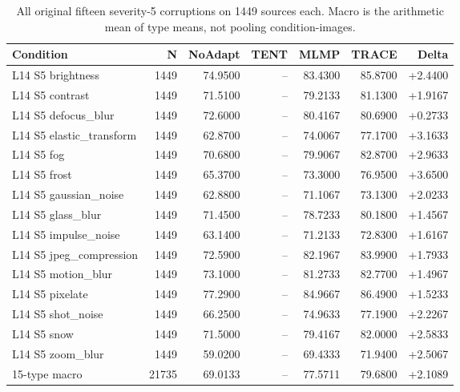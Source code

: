 \begin{table}[htbp]
\centering\scriptsize
\caption{All original fifteen severity-5 corruptions on 1449 sources each. Macro is the arithmetic mean of type means, not pooling condition-images.}
\label{tab:corruptions}
\setlength{\tabcolsep}{4pt}
\begin{tabular}{lrrrrrr}
\toprule
Condition & N & NoAdapt & TENT & MLMP & TRACE & Delta \\
\midrule
L14 S5 brightness & 1449 & 74.9500 & -- & 83.4300 & 85.8700 & +2.4400 \\
L14 S5 contrast & 1449 & 71.5100 & -- & 79.2133 & 81.1300 & +1.9167 \\
L14 S5 defocus\_blur & 1449 & 72.6000 & -- & 80.4167 & 80.6900 & +0.2733 \\
L14 S5 elastic\_transform & 1449 & 62.8700 & -- & 74.0067 & 77.1700 & +3.1633 \\
L14 S5 fog & 1449 & 70.6800 & -- & 79.9067 & 82.8700 & +2.9633 \\
L14 S5 frost & 1449 & 65.3700 & -- & 73.3000 & 76.9500 & +3.6500 \\
L14 S5 gaussian\_noise & 1449 & 62.8800 & -- & 71.1067 & 73.1300 & +2.0233 \\
L14 S5 glass\_blur & 1449 & 71.4500 & -- & 78.7233 & 80.1800 & +1.4567 \\
L14 S5 impulse\_noise & 1449 & 63.1400 & -- & 71.2133 & 72.8300 & +1.6167 \\
L14 S5 jpeg\_compression & 1449 & 72.5900 & -- & 82.1967 & 83.9900 & +1.7933 \\
L14 S5 motion\_blur & 1449 & 73.1000 & -- & 81.2733 & 82.7700 & +1.4967 \\
L14 S5 pixelate & 1449 & 77.2900 & -- & 84.9667 & 86.4900 & +1.5233 \\
L14 S5 shot\_noise & 1449 & 66.2500 & -- & 74.9633 & 77.1900 & +2.2267 \\
L14 S5 snow & 1449 & 71.5000 & -- & 79.4167 & 82.0000 & +2.5833 \\
L14 S5 zoom\_blur & 1449 & 59.0200 & -- & 69.4333 & 71.9400 & +2.5067 \\
15-type macro & 21735 & 69.0133 & -- & 77.5711 & 79.6800 & +2.1089 \\
\bottomrule
\end{tabular}
\end{table}
